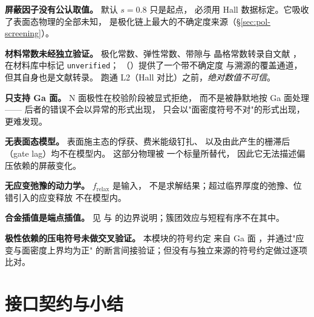 \limitsheading

\begin{bounds}
  \item \textbf{屏蔽因子没有公认取值。} 默认 $s=0.8$ 只是起点，
        必须用 Hall 数据标定。它吸收了表面态物理的全部未知，
        是极化链上最大的不确定度来源（\S\ref{sec:pol-screening}）。

  \item \textbf{材料常数未经独立验证。} 极化常数、弹性常数、带隙与
        晶格常数转录自文献 \cite{ambacher2000,vurgaftman2003}，
        在材料库中标记 \texttt{unverified}；
        （）提供了一个带不确定度
        与溯源的覆盖通道，但其自身也是文献转录。
        跑通 L2（Hall 对比）之前，\emph{绝对数值不可信}。

  \item \textbf{只支持 Ga 面。} N 面极性在校验阶段被显式拒绝，
        而不是被静默地按 Ga 面处理 —— 后者的错误不会以异常的形式出现，
        只会以"面密度符号不对"的形式出现，更难发现。

  \item \textbf{无表面态模型。} 表面施主态的俘获、费米能级钉扎、
        以及由此产生的栅滞后（gate lag）均不在模型内。
        这部分物理被  一个标量所替代，
        因此它无法描述偏压依赖的屏蔽变化。

  \item \textbf{无应变弛豫的动力学。} $f_{\text{relax}}$ 是输入，
        不是求解结果；超过临界厚度的弛豫、位错引入的应变释放
        不在模型内。

  \item \textbf{合金插值是端点插值。} 见  与
         的边界说明；簇团效应与短程有序不在其中。

  \item \textbf{极性依赖的压电符号未做交叉验证。} 本模块的符号约定
        来自 Ga 面 \cite{ambacher2000}，并通过"应变与面密度上界均为正"
        的断言间接验证；但没有与独立来源的符号约定做过逐项比对。
\end{bounds}

\section{接口契约与小结}
\label{sec:pol-interface}

